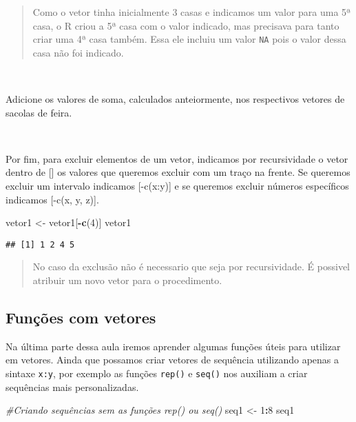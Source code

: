 \documentclass[]{book}
\newenvironment{Shaded}{\begin{snugshade}}{\end{snugshade}}
\newcommand{\CommentTok}[1]{\textcolor[rgb]{0.56,0.35,0.01}{\textit{#1}}}
\newcommand{\DecValTok}[1]{\textcolor[rgb]{0.00,0.00,0.81}{#1}}
\newcommand{\KeywordTok}[1]{\textcolor[rgb]{0.13,0.29,0.53}{\textbf{#1}}}
\newcommand{\NormalTok}[1]{#1}
\newcommand{\OperatorTok}[1]{\textcolor[rgb]{0.81,0.36,0.00}{\textbf{#1}}}
\newcommand{\StringTok}[1]{\textcolor[rgb]{0.31,0.60,0.02}{#1}}
\theoremstyle{definition}
\theoremstyle{definition}
\theoremstyle{definition}
\theoremstyle{remark}
\let\BeginKnitrBlock\begin \let\EndKnitrBlock\end
\begin{document}
\begin{quote}
Como o vetor tinha inicialmente 3 casas e indicamos um valor para uma 5ª casa, o R criou a 5ª casa com o valor indicado, mas precisava para tanto criar uma 4ª casa também. Essa ele incluiu um valor \texttt{NA} pois o valor dessa casa não foi indicado.
\end{quote}

~

\BeginKnitrBlock{exercise}
\protect\hypertarget{exr:unnamed-chunk-41}{}{\label{exr:unnamed-chunk-41} }Adicione os valores de soma, calculados anteiormente, nos respectivos vetores de sacolas de feira.
\EndKnitrBlock{exercise}

~

Por fim, para excluir elementos de um vetor, indicamos por recursividade o vetor dentro de {[}{]} os valores que queremos excluir com um traço na frente. Se queremos excluir um intervalo indicamos {[}-c(x:y){]} e se queremos excluir números específicos indicamos {[}-c(x, y, z){]}.

\begin{Shaded}
\begin{Highlighting}[]
\NormalTok{vetor1 <-}\StringTok{ }\NormalTok{vetor1[}\OperatorTok{-}\KeywordTok{c}\NormalTok{(}\DecValTok{4}\NormalTok{)]}
\NormalTok{vetor1}
\end{Highlighting}
\end{Shaded}

\begin{verbatim}
## [1] 1 2 4 5
\end{verbatim}

\begin{quote}
No caso da exclusão não é necessario que seja por recursividade. É possivel atribuir um novo vetor para o procedimento.
\end{quote}

\hypertarget{funuxe7uxf5es-com-vetores}{%
\subsection{Funções com vetores}\label{funuxe7uxf5es-com-vetores}}

Na última parte dessa aula iremos aprender algumas funções úteis para utilizar em vetores. Ainda que possamos criar vetores de sequência utilizando apenas a sintaxe \texttt{x:y}, por exemplo as funções \texttt{rep()} e \texttt{seq()} nos auxiliam a criar sequências mais personalizadas.

\begin{Shaded}
\begin{Highlighting}[]
\CommentTok{#Criando sequências sem as funções rep() ou seq()}
\NormalTok{seq1 <-}\StringTok{ }\DecValTok{1}\OperatorTok{:}\DecValTok{8}
\NormalTok{seq1}
\end{Highlighting}
\end{Shaded}
\end{document}
